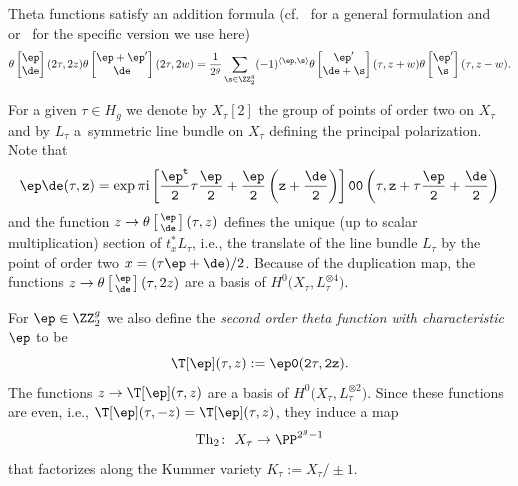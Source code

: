 Theta functions satisfy an addition formula (cf.~\cite{Ig72} for a general formulation and~\cite{Gr} or~\cite{GSM} for the specific version we use here)
\[
\theta \begin{bmatrix} \ep \\ \de \end{bmatrix} (2\tau, 2z) \theta \begin{bmatrix} \ep + \ep' \\ \de \end{bmatrix} (2\tau, 2w)= \frac{1}{2^g} \sum_{\s \in \ZZ_2^{g}}(-1)^{\langle \ep , \s\rangle} \theta \begin{bmatrix} \ep '\\ \de +\s \end{bmatrix} (\tau, z+w) \theta \begin{bmatrix} \ep'\\ \s \end{bmatrix} (\tau,z-w).
\]

For a given $\tau \in H_g$ we denote by $X_{\tau}[2]$ the group of points of order two on $X_{\tau}$ and by $L_{\tau}$ a~symmetric line bundle on $X_\tau$ defining the principal polarization. Note that
\[
\tt\ep\de(\tau,z)=\exp \pi {\rm i} \left[\frac{\ep^t}{2}\tau\frac{\ep}{2} +\frac{\ep}{2}\left(z+\frac{\de}{2}\right) \right]\tt{0}{0}\left( \tau,z+ \tau\frac{\ep}{2} +\frac{\de}{2} \right)
\]
and the function $z \to
\theta\left[\begin{smallmatrix}\ep \\ \de \end{smallmatrix}\right] (\tau,z)$ defines the unique (up to scalar multiplication)
section of $t_x^*L_{\tau}$, i.e., the translate of the line bundle $L_{\tau}$ by the point of order two $x=(\tau \ep +\de)/2$. Because of the duplication map, the functions $z \rightarrow
\theta\left[\begin{smallmatrix}\ep \\ \de \end{smallmatrix}\right] (\tau,2z)$ are a basis of $H^0\big(X_\tau, L_{\tau}^{\otimes 4}\big)$.

For $\ep\in\ZZ_2^g$ we also
define the {\it second order theta function with characteristic $\ep$} to
be
\[
\T[\ep](\tau,z):=\tt{\ep}{0}(2\tau,2z).
\]
The functions $z \rightarrow \T[\ep](\tau,z)$ are a basis of $H^0\big(X_\tau, L_{\tau}^{\otimes 2}\big)$. Since these functions are even, i.e., $
\T[\ep](\tau,-z)=
\T[\ep](\tau,z)$, they induce a map
\[
{\rm Th}_2\colon \ X_\tau\to \PP^{2^g-1}
\]
 that factorizes along the Kummer variety $ K_{\tau}:=X_\tau/\pm 1$.

